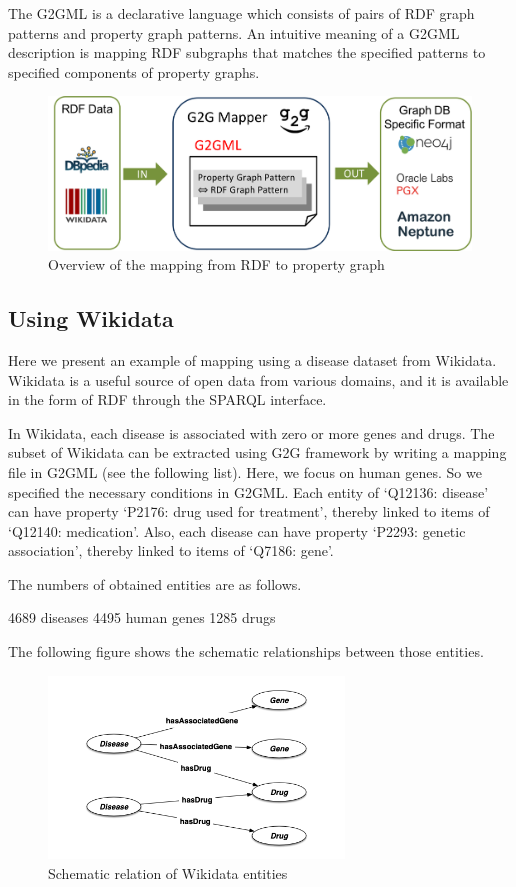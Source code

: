 \documentclass[runningheads]{llncs}
\begin{document}
The G2GML is a declarative language which consists of pairs of RDF graph patterns and property graph patterns. 
An intuitive meaning of a G2GML description is mapping RDF subgraphs that matches the specified patterns to specified components of property graphs.
 
 
\begin{figure}
\center
\includegraphics[width=1.0\textwidth]{dataflow.png}
\caption{Overview of the mapping from RDF to property graph}
\label{fig:dataflow}
\end{figure}
 
\subsection{Using Wikidata}
 
Here we present an example of mapping using a disease dataset from Wikidata. Wikidata is a useful source of open data from various domains, and it is available in the form of RDF through the SPARQL interface.
 
In Wikidata, each disease is associated with zero or more genes and drugs.
The subset of Wikidata can be extracted using G2G framework by writing a mapping file in G2GML (see the following list).
Here, we focus on human genes. So we specified the necessary conditions in G2GML.
Each entity of ‘Q12136: disease’ can have property ‘P2176: drug used for treatment’, thereby linked to items of ‘Q12140: medication’. Also, each disease can have property ‘P2293: genetic association’, thereby linked to items of ‘Q7186: gene’.
 
The numbers of obtained entities are as follows.
 
4689 diseases
4495 human genes
1285 drugs
 
The following figure shows the schematic relationships between those entities.
 
\begin{figure}
\center
\includegraphics[width=0.7\textwidth]{wikidata_schema.png}
\caption{Schematic relation of Wikidata entities}
\label{fig:wikidata_schema.png}
\end{figure}
 
\end{document}
